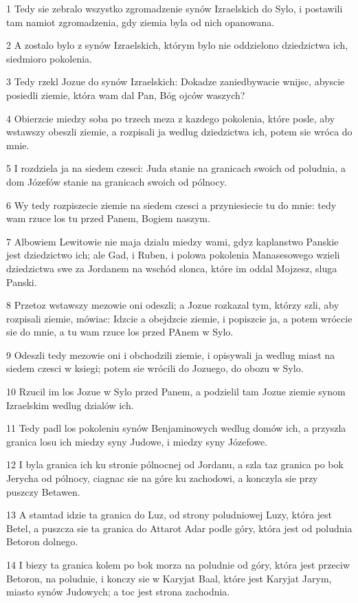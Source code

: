 \par 1 Tedy sie zebralo wszystko zgromadzenie synów Izraelskich do Sylo, i postawili tam namiot zgromadzenia, gdy ziemia byla od nich opanowana.
\par 2 A zostalo bylo z synów Izraelskich, którym bylo nie oddzielono dziedzictwa ich, siedmioro pokolenia.
\par 3 Tedy rzekl Jozue do synów Izraelskich: Dokadze zaniedbywacie wnijsc, abyscie posiedli ziemie, która wam dal Pan, Bóg ojców waszych?
\par 4 Obierzcie miedzy soba po trzech meza z kazdego pokolenia, które posle, aby wstawszy obeszli ziemie, a rozpisali ja wedlug dziedzictwa ich, potem sie wróca do mnie.
\par 5 I rozdziela ja na siedem czesci: Juda stanie na granicach swoich od poludnia, a dom Józefów stanie na granicach swoich od pólnocy.
\par 6 Wy tedy rozpiszecie ziemie na siedem czesci a przyniesiecie tu do mnie: tedy wam rzuce los tu przed Panem, Bogiem naszym.
\par 7 Albowiem Lewitowie nie maja dzialu miedzy wami, gdyz kaplanstwo Panskie jest dziedzictwo ich; ale Gad, i Ruben, i polowa pokolenia Manasesowego wzieli dziedzictwa swe za Jordanem na wschód slonca, które im oddal Mojzesz, sluga Panski.
\par 8 Przetoz wstawszy mezowie oni odeszli; a Jozue rozkazal tym, którzy szli, aby rozpisali ziemie, mówiac: Idzcie a obejdzcie ziemie, i popiszcie ja, a potem wróccie sie do mnie, a tu wam rzuce los przed PAnem w Sylo.
\par 9 Odeszli tedy mezowie oni i obchodzili ziemie, i opisywali ja wedlug miast na siedem czesci w ksiegi; potem sie wrócili do Jozuego, do obozu w Sylo.
\par 10 Rzucil im los Jozue w Sylo przed Panem, a podzielil tam Jozue ziemie synom Izraelskim wedlug dzialów ich.
\par 11 Tedy padl los pokoleniu synów Benjaminowych wedlug domów ich, a przyszla granica losu ich miedzy syny Judowe, i miedzy syny Józefowe.
\par 12 I byla granica ich ku stronie pólnocnej od Jordanu, a szla taz granica po bok Jerycha od pólnocy, ciagnac sie na góre ku zachodowi, a konczyla sie przy puszczy Betawen.
\par 13 A stamtad idzie ta granica do Luz, od strony poludniowej Luzy, która jest Betel, a puszcza sie ta granica do Attarot Adar podle góry, która jest od poludnia Betoron dolnego.
\par 14 I biezy ta granica kolem po bok morza na poludnie od góry, która jest przeciw Betoron, na poludnie, i konczy sie w Karyjat Baal, które jest Karyjat Jarym, miasto synów Judowych; a toc jest strona zachodnia.
